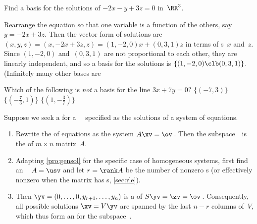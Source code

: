 \begin{example} 
Find a basis for the solutions of \(-2x-y+3z=0\) in~\(\RR^3\).
\begin{solution} 
Rearrange the equation so that one variable is a function of the others, say \(y=-2x+3z\).
Then the vector form of solutions are \((x,y,z)=(x,-2x+3z,z)=(1,-2,0)x+(0,3,1)z\) in terms of s~\(x\) and~\(z\).
Since \((1,-2,0)\) and~\((0,3,1)\) are not proportional to each other, they are linearly independent, and so a basis for the solutions is \(\{(1,-2,0)\clb (0,3,1)\}\).
(Infinitely many other bases are 
\end{solution}
\end{example}



\begin{activity}
Which of the following is \emph{not} a basis for the line \(3x+7y=0\)?
{\(\{(-7,3)\}\)}
{\(\{(-\frac73,1)\}\)}
{\(\{(1,-\frac37)\}\)}
\end{activity}





\begin{procedure} \label{pro:bfe}
Suppose we seek a  for a ~\WW\ specified as the solutions of a system of equations.
\begin{enumerate}
\item Rewrite the  of equations as the  system \(A\xv=\ov\)\,. 
Then the subspace~\WW\ is the  of \(m\times n\) matrix~\(A\).
\item  Adapting \cref{pro:gensol} for the specific case of homogeneous systems, first find an \svd\  \(A=\usv\) and let \(r=\rank A\) be the number of nonzero s (or effectively nonzero when the matrix has s, \cref{sec:rle}).
\item Then \(\yv=(0,\ldots,0,y_{r+1},\ldots,y_n)\) is a  of \(S\yv=\zv=\ov\)\,.
Consequently, all possible solutions \(\xv=V\yv\) are spanned by the last \(n-r\) columns of~\(V\), which thus form an  for the subspace~\WW.
\end{enumerate}
\end{procedure}



